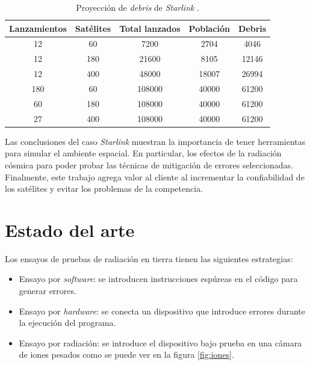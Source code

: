 \begin{table}[h]
	\centering
    \caption[Proyección de \emph{debris}]{Proyección de \emph{debris} de \emph{Starlink} \citep{ARTICLE:cibils}.}
	\begin{tabular}{c c c c c}    
		\toprule
        \textbf{Lanzamientos} & \textbf{Satélites} & \textbf{Total lanzados} & \textbf{Población} & \textbf{Debris}\\
		\midrule
        12                    & 60                 & 7200                    & 2704               & 4046\\		
        12                    & 180                & 21600                   & 8105               & 12146\\		
        12                    & 400                & 48000                   & 18007              & 26994\\		
        180                   & 60                 & 108000                  & 40000              & 61200\\		
        60                    & 180                & 108000                  & 40000              & 61200\\		
        27                    & 400                & 108000                  & 40000              & 61200\\		
		\bottomrule
		\hline
	\end{tabular}
	\label{tab:starlinkdebris}
\end{table}

Las conclusiones del caso \emph{Starlink} muestran la importancia de tener herramientas para simular el ambiente espacial.
En particular, los efectos de la radiación cósmica para poder probar las técnicas de mitigación de errores seleccionadas.
Finalmente, este trabajo agrega valor al cliente al incrementar la confiabilidad de los satélites y evitar los problemas de la competencia.

\section{Estado del arte}
\label{sec:arte}

Los ensayos de pruebas de radiación en tierra tienen las siguientes estrategias:
\begin{itemize}
    \item Ensayo por \emph{software}: se introducen instrucciones espúreas en el código para generar errores.
    \item Ensayo por \emph{hardware}: se conecta un dispositivo que introduce errores durante la ejecución del programa.
    \item Ensayo por radiación: se introduce el dispositivo bajo prueba en una cámara de iones pesados como se puede ver en la figura \ref{fig:iones}.
\end{itemize}

